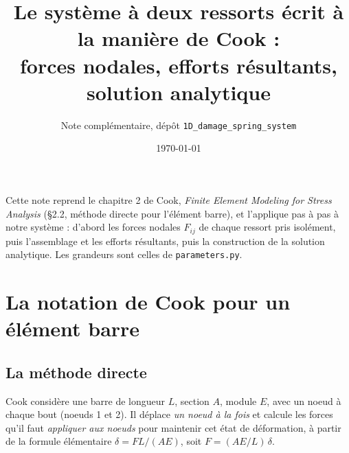 \documentclass[11pt,a4paper]{article}
\title{Le système à deux ressorts écrit à la manière de Cook :\\
forces nodales, efforts résultants, solution analytique}
\author{Note complémentaire, dépôt \texttt{1D\_damage\_spring\_system}}
\date{\today}
\begin{document}
\maketitle

\begin{center}
\small Cette note reprend le chapitre 2 de Cook, \emph{Finite Element Modeling for Stress
Analysis} (§2.2, méthode directe pour l'élément barre), et l'applique pas à pas à notre
système : d'abord les forces nodales $F_{ij}$ de chaque ressort pris isolément, puis
l'assemblage et les efforts résultants, puis la construction de la solution analytique. Les
grandeurs sont celles de \texttt{parameters.py}.
\end{center}

\section{La notation de Cook pour un élément barre}

\subsection{La méthode directe}
Cook considère une barre de longueur $L$, section $A$, module $E$, avec un noeud à chaque
bout (noeuds 1 et 2). Il déplace \emph{un noeud à la fois} et calcule les forces qu'il faut
\emph{appliquer aux noeuds} pour maintenir cet état de déformation, à partir de la formule
élémentaire $\delta = FL/(AE)$, soit $F = (AE/L)\,\delta$.

\begin{center}
\end{center}
\end{document}

